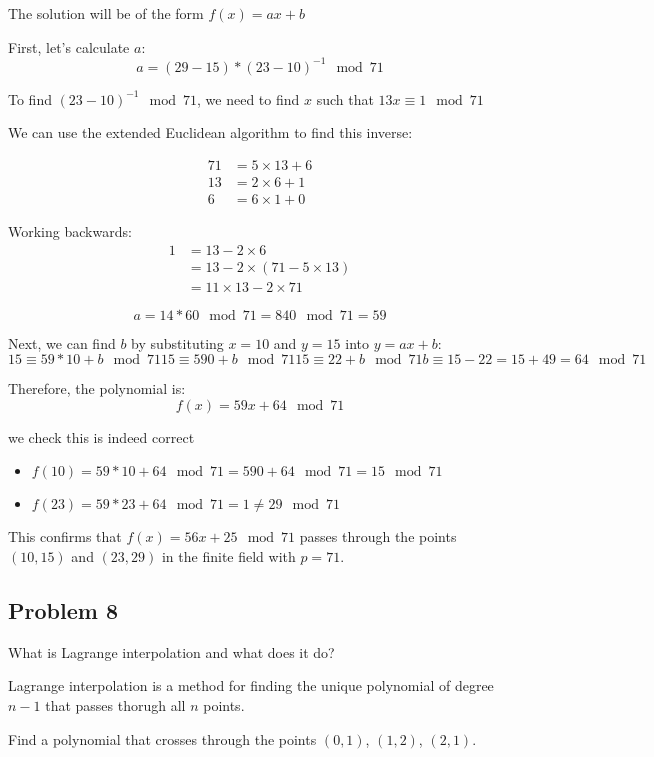 \documentclass{article}
\begin{document}
The solution will be of the form $f(x) = ax + b$

First, let's calculate $a$:
\[
a = (29-15) * (23-10)^{-1} \mod 71
\]

To find $(23-10)^{-1} \mod 71$, we need to find $x$ such that $13x \equiv 1 \mod 71$

We can use the extended Euclidean algorithm to find this inverse:

\begin{align*}
71 &= 5 \times 13 + 6 \\
13 &= 2 \times 6 + 1 \\
6 &= 6 \times 1 + 0
\end{align*}

Working backwards:
\begin{align*}
1 &= 13 - 2 \times 6 \\
  &= 13 - 2 \times (71 - 5 \times 13) \\
  &= 11 \times 13 - 2 \times 71
\end{align*}

\[
a = 14 * 60 \mod 71 = 840 \mod 71 = 59
\]

Next, we can find $b$ by substituting $x=10$ and $y=15$ into $y = ax + b$:
\[
15 \equiv 59 * 10 + b \mod 71
15 \equiv 590 + b \mod 71
15 \equiv 22 + b \mod 71
b \equiv 15 - 22 = 15 + 49 = 64 \mod 71
\]

Therefore, the polynomial is:
\[
f(x) = 59x + 64 \mod 71
\]

we check this is indeed correct
\begin{itemize}
    \item $f(10) = 59 * 10 + 64 \mod 71 = 590 + 64 \mod 71 = 15 \mod 71$
    \item $f(23) = 59 * 23 + 64 \mod 71 = 1 \neq 29 \mod 71$
\end{itemize}

This confirms that $f(x) = 56x + 25 \mod 71$ passes through the points $(10, 15)$ and $(23, 29)$ in the finite field with $p=71$.

\subsection*{Problem 8}
What is Lagrange interpolation and what does it do?

Lagrange interpolation is a method for finding the unique polynomial of degree $n-1$ that passes thorugh all $n$ points.

Find a polynomial that crosses through the points $(0, 1)$, $(1, 2)$, $(2, 1)$.
\end{document}
